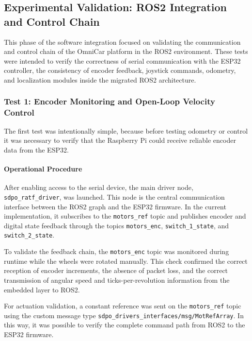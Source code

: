  \subsection{Experimental Validation: ROS2 Integration and Control Chain}
  This phase of the software integration focused on validating the
  communication and control chain of the OmniCar platform in the ROS2 environment.
  These tests were intended to verify the correctness of serial communication with
  the ESP32 controller, the consistency of encoder feedback, joystick commands, odometry, and localization modules inside the migrated ROS2 architecture.

  \subsubsection{Test 1: Encoder Monitoring and Open-Loop Velocity Control}
  The first test was intentionally simple, because before testing odometry or control it was necessary to verify that the Raspberry Pi could receive reliable encoder data from the ESP32.

  \paragraph{Operational Procedure}
  After enabling access to the serial device, the main driver node,
  \texttt{sdpo\_ratf\_driver}, was launched. This node is the central
  communication interface between the ROS2 graph and the ESP32 firmware. In the
  current implementation, it subscribes to the \texttt{motors\_ref} topic and
  publishes encoder and digital state feedback through the topics
  \texttt{motors\_enc}, \texttt{switch\_1\_state}, and \texttt{switch\_2\_state}.
  
  \vspace{0.2cm}
  
  To validate the feedback chain, the \texttt{motors\_enc} topic was monitored
  during runtime while the wheels were rotated manually. This check confirmed the
  correct reception of encoder increments, the absence of packet loss, and the
  correct transmission of angular speed and ticks-per-revolution information from
  the embedded layer to ROS2.

  \vspace{0.2cm}
  
  For actuation validation, a constant reference was sent on the
  \texttt{motors\_ref} topic using the custom message type
  \texttt{sdpo\_drivers\_interfaces/msg/MotRefArray}. In this way, it was possible
  to verify the complete command path from ROS2 to the ESP32 firmware.

